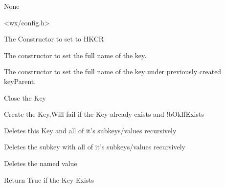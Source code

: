 None

<wx/config.h>

\label{wxregkeyregkey}


The Constructor to set to HKCR


The constructor to set the full name of the key.


The constructor to set the full name of the key under previously created keyParent.


\label{wxregkeyclose}


Close the Key


\label{wxregkeycreate}


Create the Key,Will fail if the Key already exists and !bOkIfExists


\label{wxregkeydeleteself}


Deletes this Key and all of it's subkeys/values recursively


\label{wxregkeydeletekey}


Deletes the subkey with all of it's subkeys/values recursively


\label{wxregkeydeletevalue}


Deletes the named value


\label{wxregkeyexists}


Return True if the Key Exists


\label{wxregkeygetname}


